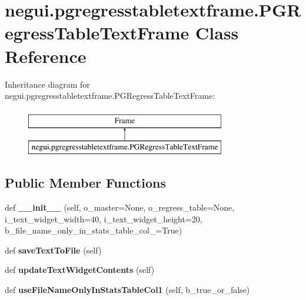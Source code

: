\hypertarget{classnegui_1_1pgregresstabletextframe_1_1PGRegressTableTextFrame}{}\section{negui.\+pgregresstabletextframe.\+P\+G\+Regress\+Table\+Text\+Frame Class Reference}
\label{classnegui_1_1pgregresstabletextframe_1_1PGRegressTableTextFrame}
Inheritance diagram for negui.\+pgregresstabletextframe.\+P\+G\+Regress\+Table\+Text\+Frame\+:\begin{figure}[H]
\begin{center}
\leavevmode
\includegraphics[height=2.000000cm]{classnegui_1_1pgregresstabletextframe_1_1PGRegressTableTextFrame}
\end{center}
\end{figure}
\subsection*{Public Member Functions}
\begin{DoxyCompactItemize}
\item 
def {\bfseries \+\_\+\+\_\+init\+\_\+\+\_\+} (self, o\+\_\+master=None, o\+\_\+regress\+\_\+table=None, i\+\_\+text\+\_\+widget\+\_\+width=40, i\+\_\+text\+\_\+widget\+\_\+height=20, b\+\_\+file\+\_\+name\+\_\+only\+\_\+in\+\_\+stats\+\_\+table\+\_\+col\+\_=True)\hypertarget{classnegui_1_1pgregresstabletextframe_1_1PGRegressTableTextFrame_a2916403111088ff606f48337f56db976}{}\label{classnegui_1_1pgregresstabletextframe_1_1PGRegressTableTextFrame_a2916403111088ff606f48337f56db976}

\item 
def {\bfseries save\+Text\+To\+File} (self)\hypertarget{classnegui_1_1pgregresstabletextframe_1_1PGRegressTableTextFrame_a00355112325dec7925e003812d1aaef4}{}\label{classnegui_1_1pgregresstabletextframe_1_1PGRegressTableTextFrame_a00355112325dec7925e003812d1aaef4}

\item 
def {\bfseries update\+Text\+Widget\+Contents} (self)\hypertarget{classnegui_1_1pgregresstabletextframe_1_1PGRegressTableTextFrame_ab1dda69065d38d0a8c978ee5ce2fcce9}{}\label{classnegui_1_1pgregresstabletextframe_1_1PGRegressTableTextFrame_ab1dda69065d38d0a8c978ee5ce2fcce9}

\item 
def {\bfseries use\+File\+Name\+Only\+In\+Stats\+Table\+Col1} (self, b\+\_\+true\+\_\+or\+\_\+false)\hypertarget{classnegui_1_1pgregresstabletextframe_1_1PGRegressTableTextFrame_a821835017148ea0ed18f30055908b2bc}{}\label{classnegui_1_1pgregresstabletextframe_1_1PGRegressTableTextFrame_a821835017148ea0ed18f30055908b2bc}

\end{DoxyCompactItemize}


